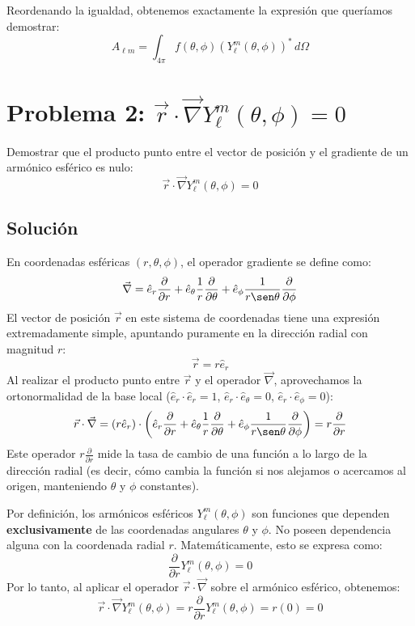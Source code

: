 \documentclass[a4paper]{article}
\begin{document}
Reordenando la igualdad, obtenemos exactamente la expresión que queríamos demostrar:
$$A_{\ell m} = \int_{4\pi} f(\theta, \phi) (Y_\ell^m(\theta, \phi))^* \, d\Omega$$



\section{Problema 2: $\vec{r} \cdot \vec{\nabla} Y_\ell^m(\theta,\phi) = 0$}

Demostrar que el producto punto entre el vector de posición y el gradiente de un armónico esférico es nulo:
$$\vec{r} \cdot \vec{\nabla} Y_\ell^m(\theta,\phi) = 0$$

\subsection{Solución}

En coordenadas esféricas $(r, \theta, \phi)$, el operador gradiente se define como:
$$\vec{\nabla} = \hat{e}_r \frac{\partial}{\partial r} + \hat{e}_\theta \frac{1}{r} \frac{\partial}{\partial \theta} + \hat{e}_\phi \frac{1}{r \sen\theta} \frac{\partial}{\partial \phi}$$
El vector de posición $\vec{r}$ en este sistema de coordenadas tiene una expresión extremadamente simple, apuntando puramente en la dirección radial con magnitud $r$:
$$\vec{r} = r \hat{e}_r$$
Al realizar el producto punto entre $\vec{r}$ y el operador $\vec{\nabla}$, aprovechamos la ortonormalidad de la base local ($\hat{e}_r \cdot \hat{e}_r = 1$, $\hat{e}_r \cdot \hat{e}_\theta = 0$, $\hat{e}_r \cdot \hat{e}_\phi = 0$):
$$\vec{r} \cdot \vec{\nabla} = (r \hat{e}_r) \cdot \left( \hat{e}_r \frac{\partial}{\partial r} + \hat{e}_\theta \frac{1}{r} \frac{\partial}{\partial \theta} + \hat{e}_\phi \frac{1}{r \sen\theta} \frac{\partial}{\partial \phi} \right) = r \frac{\partial}{\partial r}$$
Este operador $r \frac{\partial}{\partial r}$ mide la tasa de cambio de una función a lo largo de la dirección radial (es decir, cómo cambia la función si nos alejamos o acercamos al origen, manteniendo $\theta$ y $\phi$ constantes).

Por definición, los armónicos esféricos $Y_\ell^m(\theta,\phi)$ son funciones que dependen \textbf{exclusivamente} de las coordenadas angulares $\theta$ y $\phi$. No poseen dependencia alguna con la coordenada radial $r$. Matemáticamente, esto se expresa como:
$$\frac{\partial}{\partial r} Y_\ell^m(\theta,\phi) = 0$$
Por lo tanto, al aplicar el operador $\vec{r} \cdot \vec{\nabla}$ sobre el armónico esférico, obtenemos:
$$\vec{r} \cdot \vec{\nabla} Y_\ell^m(\theta,\phi) = r \frac{\partial}{\partial r} Y_\ell^m(\theta,\phi) = r (0) = 0$$
\end{document}
